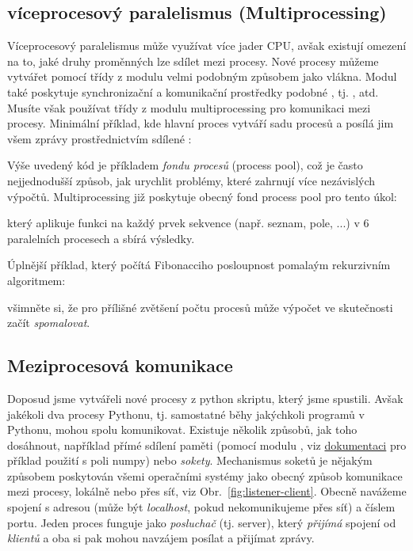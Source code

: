 \subsection{víceprocesový paralelismus (Multiprocessing)}
Víceprocesový paralelismus může využívat více jader CPU, avšak existují omezení na to, jaké druhy proměnných lze sdílet mezi procesy. Nové procesy můžeme vytvářet pomocí třídy  z modulu  velmi podobným způsobem jako vlákna. Modul  také poskytuje synchronizační a komunikační prostředky podobné , tj. ,  atd. Musíte však používat třídy z modulu multiprocessing pro komunikaci mezi procesy. Minimální příklad, kde hlavní proces vytváří sadu procesů a posílá jim všem zprávy prostřednictvím sdílené :


Výše uvedený kód je příkladem \emph{fondu procesů} (process pool), což je často nejjednodušší způsob, jak urychlit problémy, které zahrnují více nezávislých výpočtů. Multiprocessing již poskytuje obecný fond process pool pro tento úkol:

který aplikuje funkci  na každý prvek sekvence (např. seznam, pole, ...) v 6 paralelních procesech a sbírá výsledky.

Úplnější příklad, který počítá Fibonacciho posloupnost pomalaým rekurzivním algoritmem:

všimněte si, že pro přílišné zvětšení počtu procesů může výpočet ve skutečnosti začít \emph{spomalovat}.

\subsection{Meziprocesová komunikace}
Doposud jsme vytvářeli nové procesy z python skriptu, který jsme spustili. Avšak jakékoli dva procesy Pythonu, tj. samostatné běhy jakýchkoli programů v Pythonu, mohou spolu komunikovat. Existuje několik způsobů, jak toho dosáhnout, například přímé sdílení paměti (pomocí modulu , viz \href{https://docs.python.org/3/library/multiprocessing.shared_memory.html}{dokumentaci} pro příklad použití s poli numpy) nebo \emph{sokety}. Mechanismus soketů je nějakým způsobem poskytován všemi operačními systémy jako obecný způsob komunikace mezi procesy, lokálně nebo přes síť, viz Obr.~\ref{fig:listener-client}. Obecně navážeme spojení s adresou (může být \emph{localhost}, pokud nekomunikujeme přes síť) a číslem portu. Jeden proces funguje jako \emph{posluchač} (tj. server), který \emph{přijímá} spojení od \emph{klientů} a oba si pak mohou navzájem posílat a přijímat zprávy.

